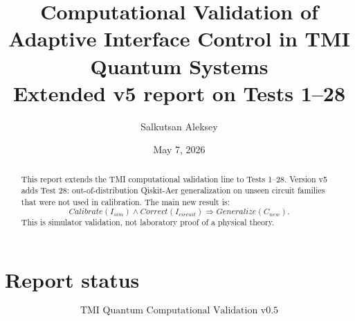 \documentclass[12pt,a4paper]{article}
\title{\textbf{Computational Validation of Adaptive Interface Control in TMI Quantum Systems}\\\large Extended v5 report on Tests 1--28}
\author{Salkutsan Aleksey}\date{May 7, 2026}
\begin{document}
\maketitle
\begin{abstract}
This report extends the TMI computational validation line to Tests 1--28. Version v5 adds Test 28: out-of-distribution Qiskit-Aer generalization on unseen circuit families that were not used in calibration. The main new result is:
\[Calibrate(I_{sim})\land Correct(I_{circuit})\Rightarrow Generalize(C_{new}).\]
This is simulator validation, not laboratory proof of a physical theory.
\end{abstract}\tableofcontents\newpage
\section{Report status}
\[\boxed{\text{TMI Quantum Computational Validation v0.5}}\]
\end{document}
